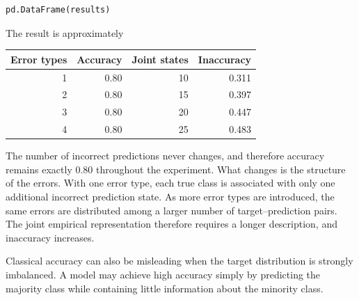 \begin{example}
\begin{sourcecode}
{\begin{verbatim}
pd.DataFrame(results)
\end{verbatim}}
\end{sourcecode}

The result is approximately

\begin{center}
\begin{tabular}{rrrr}
\hline
Error types & Accuracy & Joint states & Inaccuracy \\
\hline
1 & 0.80 & 10 & 0.311 \\
2 & 0.80 & 15 & 0.397 \\
3 & 0.80 & 20 & 0.447 \\
4 & 0.80 & 25 & 0.483 \\
\hline
\end{tabular}
\end{center}

The number of incorrect predictions never changes, and therefore accuracy remains exactly $0.80$ throughout the experiment. What changes is the structure of the errors. With one error type, each true class is associated with only one additional incorrect prediction state. As more error types are introduced, the same errors are distributed among a larger number of target--prediction pairs. The joint empirical representation therefore requires a longer description, and inaccuracy increases.
\end{example}

Classical accuracy can also be misleading when the target distribution is strongly imbalanced. A model may achieve high accuracy simply by predicting the majority class while containing little information about the minority class.


